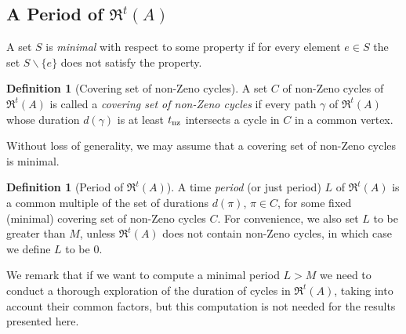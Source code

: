 \documentclass[11pt]{amsart}
\theoremstyle{definition}
\newtheorem{definition}[theorem]{Definition}
\newcommand{\ARRR}{\mathfrak{R}^t}
\begin{document}
\subsection{A Period of $\ARRR(A)$}
A set $S$ is \emph{minimal} with respect to some property if for every element $e \in S$ the set $S \smallsetminus \{e\}$ does not satisfy the property.
\begin{definition}[Covering set of non-Zeno cycles]
A set $C$ of non-Zeno cycles of $\ARRR(A)$ is called a \emph{covering set of non-Zeno cycles} if every path $\gamma$ of $\ARRR(A)$ whose duration $d(\gamma)$ is at least $t_{\textnormal{nz}}$ intersects a cycle in $C$ in a common vertex.
\end{definition}
Without loss of generality, we may assume that a covering set of non-Zeno cycles is minimal.
\begin{definition}[Period of $\ARRR(A)$]
A time \emph{period} (or just period) $L$ of $\ARRR(A)$ is a common multiple of the set of durations $d(\pi)$, $\pi \in C$, for
some fixed (minimal) covering set of non-Zeno cycles $C$.
For convenience, we also set $L$ to be greater than $M$, unless $\ARRR(A)$ does not contain non-Zeno cycles, in which case we define $L$ to be 0.
\end{definition}

We remark that if we want to compute a minimal period $L>M$ we need to conduct a thorough exploration of the duration of cycles in $\ARRR(A)$, taking into account their common factors, but this computation is not needed for the results presented here.
\end{document}

